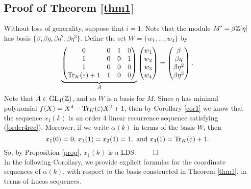 \documentclass[11pt]{amsart}
\begin{document}
\subsection*{Proof of Theorem \ref{thm1}}
Without loss of generality, suppose that $i=1$. 
Note that the module $M'=\beta\mathbb{Z}[\eta]$ has basis $\{\beta, \beta \eta, \beta \eta^2, \beta \eta^3\}$. Define the set $W=\{w_1, \dots, w_4\}$ by
\[\underbrace{\begin{pmatrix} 0 & 0 & 1 & 0 \\ 1 & 0 & 0 & 1 \\ 1 & 0 & 0 & 0 \\ \operatorname{Tr}_K(\varepsilon)+1 & 1 & 0 & 0 \end{pmatrix}}_{A} \begin{pmatrix} w_1 \\ w_2 \\ w_3 \\ w_4 \end{pmatrix} = \begin{pmatrix} \beta \\ \beta \eta \\ \beta \eta^2 \\ \beta \eta^3 \end{pmatrix}.\]
Note that $A \in \operatorname{GL}_4(\mathbb{Z})$, and so $W$ is a basis for $M$. 
Since $\eta$ has minimal polynomial $f(X)=X^4-\operatorname{Tr}_K(\varepsilon)X^2+1$, then by Corollary \ref{cor1} we know that the sequence $x_1(k)$ is an order 4 linear recurrence sequence satisfying (\ref{order4rec}). Moreover, if we write $\alpha(k)$ in terms of the basis $W$, then 
\[x_1(0)=0, \,x_1(1)=x_2(1)=1, \text{ and } x_3(1)=\operatorname{Tr}_K(\varepsilon)+1.\]
So, by Proposition \ref{prop}, $x_1(k)$ is a LDS. \hfill $\qed$ \\

In the following Corollary, we provide explicit formulas for the coordinate sequences of $\alpha(k)$, with respect to the basis constructed in Theorem \ref{thm1}, in terms of Lucas sequences.
\end{document}
